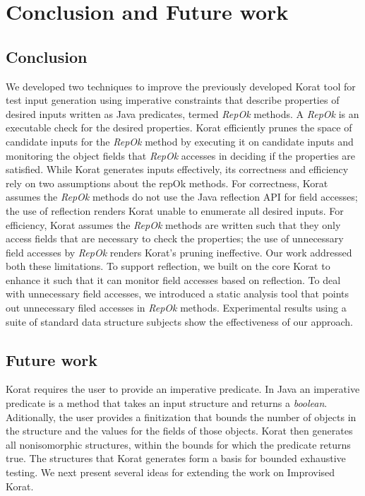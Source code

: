 \chapter{Conclusion and Future work}
\label{ch:future-work}
\section{Conclusion}
We developed two techniques to improve the previously developed Korat
tool for test input generation using imperative constraints that
describe properties of desired inputs written as Java predicates,
termed \emph{RepOk} methods.  A \emph{RepOk} is an executable check
for the desired properties.  Korat efficiently prunes the space of
candidate inputs for the \emph{RepOk} method by executing it on
candidate inputs and monitoring the object fields that \emph{RepOk}
accesses in deciding if the properties are satisfied.  While Korat
generates inputs effectively, its correctness and efficiency rely on
two assumptions about the repOk methods.  For correctness, Korat
assumes the \emph{RepOk} methods do not use the Java reflection API
for field accesses; the use of reflection renders Korat unable to
enumerate all desired inputs.  For efficiency, Korat assumes the
\emph{RepOk} methods are written such that they only access fields
that are necessary to check the properties; the use of unnecessary
field accesses by \emph{RepOk} renders Korat's pruning ineffective.
Our work addressed both these limitations.  To support reflection, we
built on the core Korat to enhance it such that it can monitor field
accesses based on reflection.  To deal with unnecessary field
accesses, we introduced a static analysis tool that points out
unnecessary filed accesses in \emph{RepOk} methods. Experimental
results using a suite of standard data structure subjects show the
effectiveness of our approach.



\section{Future work}
Korat requires the user to provide an imperative predicate. In Java an imperative predicate is a method that takes an input structure and returns a \emph{boolean}. Aditionally, the user provides a finitization that bounds the number of objects in the structure and the values for the fields of those objects. Korat then generates all nonisomorphic structures, within the bounds for which the predicate returns true. The structures that Korat generates form a basis for bounded exhaustive testing. We next present several ideas for extending the work on Improvised Korat.

